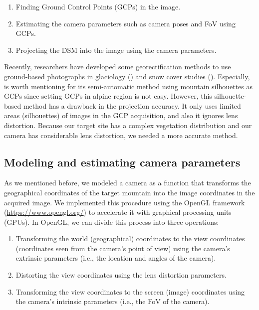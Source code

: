 \documentclass{article}
\providecommand{\tightlist}{%
  \setlength{\itemsep}{0pt}\setlength{\parskip}{0pt}}
\begin{document}
\begin{enumerate}
\def\labelenumi{\arabic{enumi}.}
\tightlist
\item
  Finding Ground Control Points (GCPs) in the image.\\
\item
  Estimating the camera parameters such as camera poses and FoV using GCPs.\\
\item
  Projecting the DSM into the image using the camera parameters.
\end{enumerate}

Recently, researchers have developed some georectification methods to use ground-based photographs in glaciology (\cite{Messerli2015GeoInst}) and snow cover studies (\cite{Portenier2020Cryosphere}). Especially, \cite{Portenier2020Cryosphere} is worth mentioning for its semi-automatic method using mountain silhouettes as GCPs since setting GCPs in alpine region is not easy. However, this silhouette-based method has a drawback in the projection accuracy. It only uses limited areas (silhouettes) of images in the GCP acquisition, and also it ignores lens distortion. Because our target site has a complex vegetation distribution and our camera has considerable lens distortion, we needed a more accurate method.

\hypertarget{modeling-and-estimating-camera-parameters}{%
\subsection{Modeling and estimating camera parameters}\label{modeling-and-estimating-camera-parameters}}

As we mentioned before, we modeled a camera as a function that transforms the geographical coordinates of the target mountain into the image coordinates in the acquired image. We implemented this procedure using the OpenGL framework (\url{https://www.opengl.org/}) to accelerate it with graphical processing units (GPUs). In OpenGL, we can divide this process into three operations:

\begin{enumerate}
\def\labelenumi{\arabic{enumi}.}
\tightlist
\item
  Transforming the world (geographical) coordinates to the view coordinates (coordinates seen from the camera's point of view) using the camera's extrinsic parameters (i.e., the location and angles of the camera).\\
\item
  Distorting the view coordinates using the lens distortion parameters.\\
\item
  Transforming the view coordinates to the screen (image) coordinates using the camera's intrinsic parameters (i.e., the FoV of the camera).
\end{enumerate}
\end{document}

